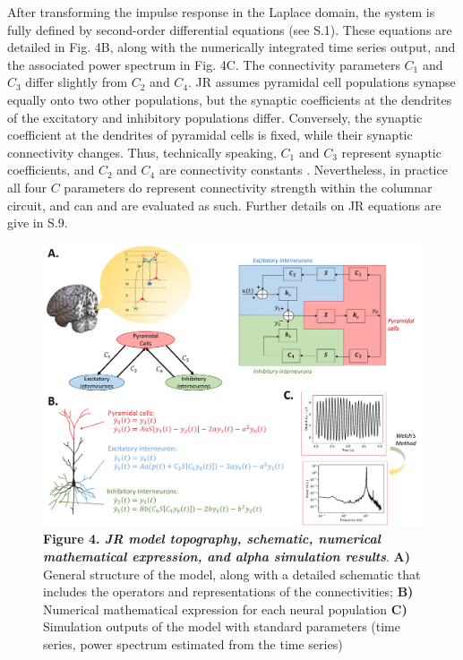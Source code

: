 \documentclass[12pt,twoside]{article}
\begin{document}
After transforming the impulse response in the Laplace domain, the system is fully defined by second-order differential equations (see S.1). These equations are detailed in Fig. 4B, along with the numerically integrated time series output, and the associated power spectrum in Fig. 4C.
The connectivity parameters $C_{1}$ and $C_{3}$ differ slightly from $C_{2}$ and $C_{4}$. JR assumes pyramidal cell populations synapse equally onto two other populations, but the synaptic coefficients at the dendrites of the excitatory and inhibitory populations differ. Conversely, the synaptic coefficient at the dendrites of pyramidal cells is fixed, while their synaptic connectivity changes. Thus, technically speaking, $C_{1}$ and $C_{3}$ represent synaptic coefficients, and $C_{2}$ and $C_{4}$ are connectivity constants \citep{cook2021neural}. Nevertheless, in practice all four $C$ parameters do represent connectivity strength within the columnar circuit, and can and are evaluated as such. Further details on JR equations are give in S.9.
\begin{figure}[H]
    \centering
    \includegraphics[scale=0.35]{Images/Jansen_rit_schematic_short.png}
    \caption*{\textbf{Figure 4.  \textit{JR model topography, schematic, numerical mathematical expression, and alpha simulation results}}. \textbf{A)} General structure of the model, along with a detailed schematic that includes the operators and representations of the connectivities; \textbf{B)} Numerical mathematical expression for each neural population \textbf{C)} Simulation outputs of the model with standard parameters (time series, power spectrum estimated from the time series)}
    \label{fig:JR_full}
\end{figure}
\end{document}
